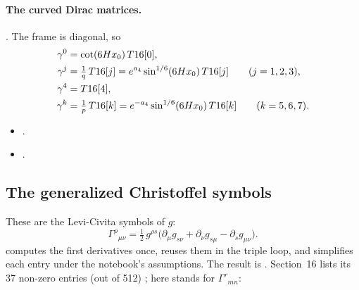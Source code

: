 \paragraph{The curved Dirac matrices.} .
The frame is diagonal, so \cfderived
\begin{equation}
\begin{aligned}
  \gamma^0&=\cot(6Hx_0)\,T16[0],\\
  \gamma^j&=\tfrac1q\,T16[j]=e^{a_4}\sin^{1/6}(6Hx_0)\,T16[j]\qquad(j=1,2,3),\\
  \gamma^4&=T16[4],\\
  \gamma^k&=\tfrac1p\,T16[k]=e^{-a_4}\sin^{1/6}(6Hx_0)\,T16[k]\qquad(k=5,6,7).
\end{aligned}
\end{equation}
\begin{itemize}
  \item {} .
  \item {} .
\end{itemize}

\subsection{The generalized Christoffel symbols}
\label{csc:christoffel}\label{sec:9.4}

These are the Levi-Civita symbols of $g$:
\begin{equation}
  \Gamma^\rho{}_{\mu\nu}=\tfrac12\,g^{\rho s}\bigl(\partial_\mu g_{s\nu}+\partial_\nu g_{s\mu}-\partial_s g_{\mu\nu}\bigr).
\end{equation}
 computes the first derivatives
 once, reuses them in the triple loop, and simplifies
each entry under the notebook's assumptions. The result is .
Section~16 lists its 37 non-zero entries (out of 512) ; here
 stands for $\Gamma^r{}_{mn}$:

